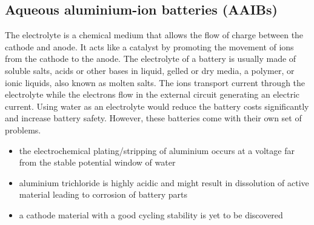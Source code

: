\subsection{Aqueous aluminium-ion batteries (AAIBs)}
The electrolyte is a chemical medium that allows the flow of charge between the cathode and anode. It acts like a catalyst by promoting the movement of ions from the cathode to the anode. The electrolyte of a battery is usually made of soluble salts, acids or other bases in liquid, gelled or dry media, a polymer, or ionic liquids, also known as molten salts. The ions transport current through the electrolyte while the electrons flow in the external circuit generating an electric current. Using water as an electrolyte would reduce the battery costs significantly and increase battery safety. However, these batteries come with their own set of problems. 

\begin{itemize}
    \item the electrochemical plating/stripping of aluminium occurs at a voltage far from the stable potential window of water
    \item aluminium trichloride  is highly acidic and might result in dissolution of active material leading to corrosion of battery parts
    \item a cathode material with a good cycling stability is yet to be discovered
\end{itemize}  

